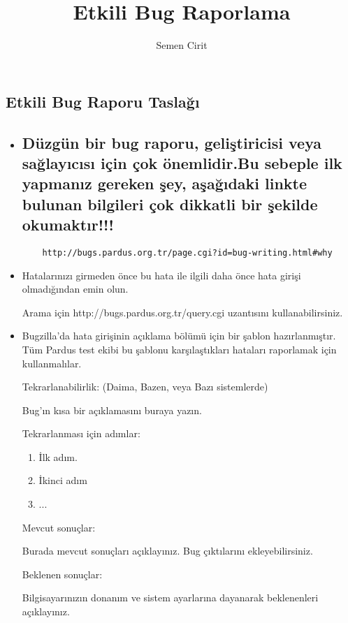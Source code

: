 \documentclass[a4paper,10pt]{article}
\title{Etkili Bug Raporlama}
\author{Semen Cirit}
\begin{document}
\maketitle

\subsection*{Etkili Bug Raporu Taslağı}

\begin{itemize}
 
  	\item \subsection*{Düzgün bir  bug raporu, geliştiricisi veya sağlayıcısı için çok önemlidir.Bu sebeple ilk yapmanız gereken şey, aşağıdaki linkte bulunan bilgileri çok dikkatli bir şekilde okumaktır!!!}
	\begin{verbatim} 
 	http://bugs.pardus.org.tr/page.cgi?id=bug-writing.html#why
	\end{verbatim}

	\item Hatalarınızı girmeden önce bu hata ile ilgili daha önce hata girişi olmadığından emin olun. 

	Arama için http://bugs.pardus.org.tr/query.cgi uzantısını kullanabilirsiniz.
	
  	\item Bugzilla'da hata girişinin açıklama bölümü için bir şablon hazırlanmıştır. Tüm Pardus test ekibi bu şablonu karşılaştıkları hataları raporlamak için kullanmalılar.

   	Tekrarlanabilirlik: (Daima, Bazen, veya Bazı sistemlerde)	
   
    	Bug'ın kısa bir açıklamasını buraya yazın.
   
   	Tekrarlanması için adımlar:
   	\begin{enumerate}
    	\item İlk adım.
    	\item İkinci adım
    	\item ...
   	\end{enumerate}

	Mevcut sonuçlar:

	Burada mevcut sonuçları açıklayınız. Bug çıktılarını ekleyebilirsiniz.
	
	Beklenen sonuçlar:

	Bilgisayarınızın donanım ve sistem ayarlarına dayanarak beklenenleri açıklayınız.
	

\end{itemize}
\end{document}

